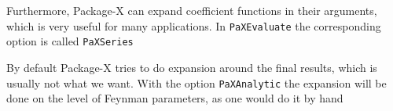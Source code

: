 \documentclass[../FeynHelpersManual.tex]{subfiles}
\begin{document}
\begin{Shaded}
\begin{Highlighting}[]
\OperatorTok{[}\OperatorTok{[}\OperatorTok{,} \OperatorTok{,} \OperatorTok{,} \OperatorTok{\{}\OperatorTok{[}\OperatorTok{,} \OperatorTok{],}\OperatorTok{[}\OperatorTok{,} \OperatorTok{],} \SpecialCharTok{\^{}}\OperatorTok{\},} \OperatorTok{\{}\SpecialCharTok{\^{}}\OperatorTok{,} \SpecialCharTok{\^{}}\OperatorTok{,} \SpecialCharTok{\^{}}\OperatorTok{\}]]}
\end{Highlighting}
\end{Shaded}

Furthermore, Package-X can expand coefficient functions in their
arguments, which is very useful for many applications. In
\texttt{PaXEvaluate} the corresponding option is called
\texttt{PaXSeries}

\begin{Shaded}
\begin{Highlighting}[]
\OperatorTok{[}\OperatorTok{[}\OperatorTok{[}\OperatorTok{,}\OperatorTok{],}\SpecialCharTok{\^{}}\OperatorTok{,}\SpecialCharTok{\^{}}\OperatorTok{],}\OtherTok{{-}\textgreater{}} \OperatorTok{\{\{}\OperatorTok{,} \OperatorTok{,} \OperatorTok{\}\}]}
\end{Highlighting}
\end{Shaded}

By default Package-X tries to do expansion around the final results,
which is usually not what we want. With the option \texttt{PaXAnalytic}
the expansion will be done on the level of Feynman parameters, as one
would do it by hand

\begin{Shaded}
\begin{Highlighting}[]
\OperatorTok{[}\OperatorTok{[}\OperatorTok{[}\OperatorTok{,}\OperatorTok{],}\SpecialCharTok{\^{}}\OperatorTok{,}\SpecialCharTok{\^{}}\OperatorTok{],}\OtherTok{{-}\textgreater{}} \OperatorTok{\{\{}\OperatorTok{,} \OperatorTok{,} \OperatorTok{\}\},}\OtherTok{{-}\textgreater{}} \OperatorTok{]}
\end{Highlighting}
\end{Shaded}
\end{document}
